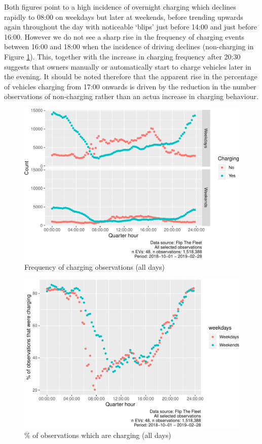 \documentclass[]{article}
\begin{document}
Both figures point to a high incidence of overnight charging which declines rapidly to 08:00 on weekdays but later at weekends, before trending upwards again throughout the day with noticeable `blips' just before 14:00 and just before 16:00. However we do not see a sharp rise in the frequency of charging events between 16:00 and 18:00 when the incidence of driving declines (non-charging in Figure \ref{fig:chargeTimeC}). This, together with the increase in charging frequency after 20:30 suggests that owners manually or automatically start to charge vehicles later in the evening. It should be noted therefore that the apparent rise in the percentage of vehicles charging from 17:00 onwards is driven by the reduction in the number observations of non-charging rather than an actua increase in charging behaviour.

\begin{figure}
\centering
\includegraphics{EVBB_report_v1_files/figure-latex/chargeTimeC-1.pdf}
\caption{\label{fig:chargeTimeC}Frequency of charging observations (all days)}
\end{figure}

\begin{figure}
\centering
\includegraphics{EVBB_report_v1_files/figure-latex/chargeTimePC-1.pdf}
\caption{\label{fig:chargeTimePC}\% of observations which are charging (all days)}
\end{figure}
\end{document}
